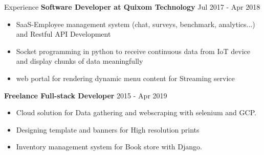 \documentclass{resume} %
\begin{document}
\begin{rSection}{Experience}
\if{}
{\textbf{Software Developer at Quixom Technology}}   \hfill {Jul 2017 - Apr 2018}
\begin{itemize}
    \item SaaS-Employee management system (chat, surveys, benchmark, analytics...) and Restful API Development
    \item Socket programming in python to receive continuous data from IoT device and display chunks of data meaningfully
    \item web portal for rendering dynamic menu content for Streaming service
\end{itemize}

{\textbf{Freelance Full-stack Developer}}   \hfill {2015 - Apr 2019}
\begin{itemize}
    \item Cloud solution for Data gathering and webscraping with selenium and GCP.
    \item Designing template and banners for High resolution prints
    \item Inventory management system for Book store with Django.
\end{itemize}
\fi

\end{rSection}
\end{document}
